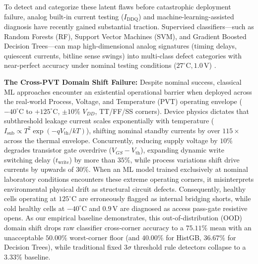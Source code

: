 \documentclass[conference]{IEEEtran}
\begin{document}
To detect and categorize these latent flaws before catastrophic deployment failure, analog built-in current testing ($I_{\text{DDQ}}$) and machine-learning-assisted diagnosis have recently gained substantial traction. Supervised classifiers---such as Random Forests (RF), Support Vector Machines (SVM), and Gradient Boosted Decision Trees---can map high-dimensional analog signatures (timing delays, quiescent currents, bitline sense swings) into multi-class defect categories with near-perfect accuracy under nominal testing conditions ($27^\circ\text{C}, 1.0\,\text{V}$) \cite{makris2018special, amrouch2022machine, moness2022semi}.

\textbf{The Cross-PVT Domain Shift Failure:} Despite nominal success, classical ML approaches encounter an existential operational barrier when deployed across the real-world Process, Voltage, and Temperature (PVT) operating envelope ($-40^\circ\text{C}$ to $+125^\circ\text{C}$, $\pm 10\%$ $V_{DD}$, TT/FF/SS corners). Device physics dictates that subthreshold leakage current scales exponentially with temperature ($I_{\text{sub}} \propto T^2 \exp(-qV_{\text{th}}/kT)$), shifting nominal standby currents by over $115\times$ across the thermal envelope. Concurrently, reducing supply voltage by $10\%$ degrades transistor gate overdrive ($V_{GS} - V_{\text{th}}$), expanding dynamic write switching delay ($t_{\text{write}}$) by more than $35\%$, while process variations shift drive currents by upwards of $30\%$. When an ML model trained exclusively at nominal laboratory conditions encounters these extreme operating corners, it misinterprets environmental physical drift as structural circuit defects. Consequently, healthy cells operating at $125^\circ\text{C}$ are erroneously flagged as internal bridging shorts, while cold healthy cells at $-40^\circ\text{C}$ and $0.9\,\text{V}$ are diagnosed as access pass-gate resistive opens. As our empirical baseline demonstrates, this out-of-distribution (OOD) domain shift drops raw classifier cross-corner accuracy to a $75.11\%$ mean with an unacceptable $50.00\%$ worst-corner floor (and $40.00\%$ for HistGB, $36.67\%$ for Decision Trees), while traditional fixed $3\sigma$ threshold rule detectors collapse to a $3.33\%$ baseline.
\end{document}
